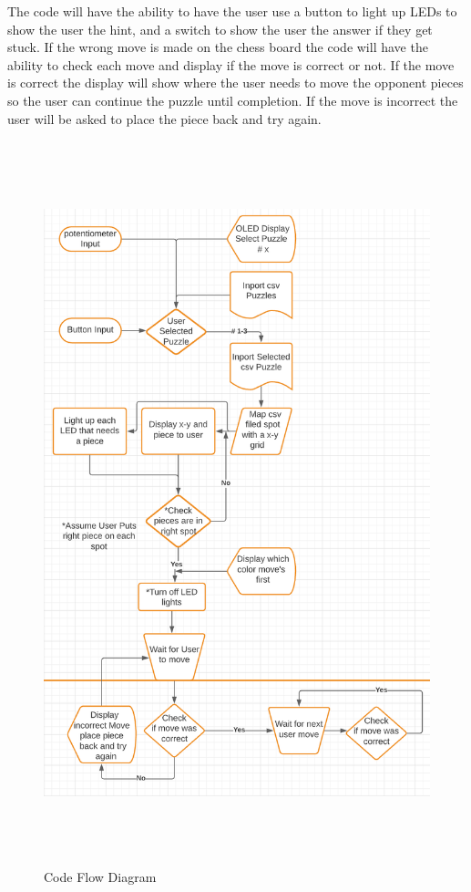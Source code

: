 \documentclass[11pt]{article}
\begin{document}
\noindent The code will have the ability to have the user use a button to light up LEDs to show the user the hint, and a switch to show the user the answer if they get stuck. If the wrong move is made on the chess board the code will have the ability to check each move and display if the move is correct or not. If the move is correct the display will show where the user needs to move the opponent pieces so the user can continue the puzzle until completion. If the move is incorrect the user will be asked to place the piece back and try again. 

\begin{center}
\begin{figure}
  \includegraphics[width=17cm,height=21cm]{./Pics/Code_Flow_Diagram.PNG}
  \caption{Code Flow Diagram}
  \label{fig:CFD1}
\end{figure}
\end{center}
\end{document}
